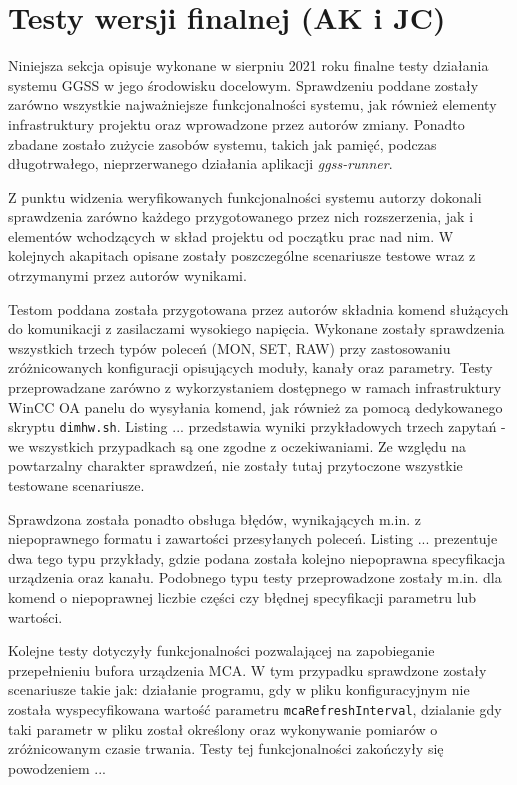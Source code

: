 \section{Testy wersji finalnej (AK i JC)}
Niniejsza sekcja opisuje wykonane w sierpniu 2021 roku finalne testy działania systemu GGSS w jego środowisku docelowym. Sprawdzeniu poddane zostały zarówno wszystkie najważniejsze funkcjonalności systemu, jak również elementy infrastruktury projektu oraz wprowadzone przez autorów zmiany. Ponadto zbadane zostało zużycie zasobów systemu, takich jak pamięć, podczas długotrwałego, nieprzerwanego działania aplikacji \emph{ggss-runner}. 

Z punktu widzenia weryfikowanych funkcjonalności systemu autorzy dokonali sprawdzenia zarówno każdego przygotowanego przez nich rozszerzenia, jak i elementów wchodzących w skład projektu od początku prac nad nim. W kolejnych akapitach opisane zostały poszczególne scenariusze testowe wraz z otrzymanymi przez autorów wynikami.

Testom poddana została przygotowana przez autorów składnia komend służących do komunikacji z zasilaczami wysokiego napięcia. Wykonane zostały sprawdzenia wszystkich trzech typów poleceń (MON, SET, RAW) przy zastosowaniu zróżnicowanych konfiguracji opisujących moduły, kanały oraz parametry. Testy przeprowadzane zarówno z wykorzystaniem dostępnego w ramach infrastruktury WinCC OA panelu do wysyłania komend, jak również za pomocą dedykowanego skryptu \lstinline{dimhw.sh}. Listing ... przedstawia wyniki przykładowych trzech zapytań - we wszystkich przypadkach są one zgodne z oczekiwaniami. Ze względu na powtarzalny charakter sprawdzeń, nie zostały tutaj przytoczone wszystkie testowane scenariusze. 



Sprawdzona została ponadto obsługa błędów, wynikających m.in. z niepoprawnego formatu i zawartości przesyłanych poleceń. Listing ... prezentuje dwa tego typu przykłady, gdzie podana została kolejno niepoprawna specyfikacja urządzenia oraz kanału. Podobnego typu testy przeprowadzone zostały m.in. dla komend o niepoprawnej liczbie części czy błędnej specyfikacji parametru lub wartości. 



Kolejne testy dotyczyły funkcjonalności pozwalającej na zapobieganie przepełnieniu bufora urządzenia MCA. W tym przypadku sprawdzone zostały scenariusze takie jak: działanie programu, gdy w pliku konfiguracyjnym nie została wyspecyfikowana wartość parametru \lstinline{mcaRefreshInterval}, dzialanie gdy taki parametr w pliku został określony oraz wykonywanie pomiarów o zróżnicowanym czasie trwania. Testy tej funkcjonalności zakończyły się powodzeniem ...

